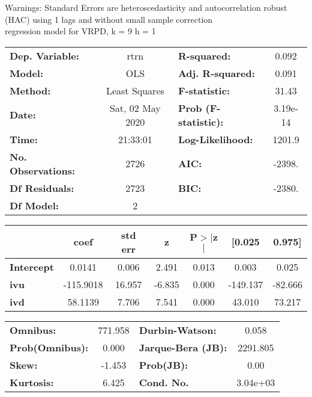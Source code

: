 Warnings: \newline
 [1] Standard Errors are heteroscedasticity and autocorrelation robust (HAC) using 1 lags and without small sample correction\\ 

regression model for VRPD, k = 9 h = 1\begin{center}
\begin{tabular}{lclc}
\toprule
\textbf{Dep. Variable:}    &       rtrn       & \textbf{  R-squared:         } &     0.092   \\
\textbf{Model:}            &       OLS        & \textbf{  Adj. R-squared:    } &     0.091   \\
\textbf{Method:}           &  Least Squares   & \textbf{  F-statistic:       } &     31.43   \\
\textbf{Date:}             & Sat, 02 May 2020 & \textbf{  Prob (F-statistic):} &  3.19e-14   \\
\textbf{Time:}             &     21:33:01     & \textbf{  Log-Likelihood:    } &    1201.9   \\
\textbf{No. Observations:} &        2726      & \textbf{  AIC:               } &    -2398.   \\
\textbf{Df Residuals:}     &        2723      & \textbf{  BIC:               } &    -2380.   \\
\textbf{Df Model:}         &           2      & \textbf{                     } &             \\
\bottomrule
\end{tabular}
\begin{tabular}{lcccccc}
                   & \textbf{coef} & \textbf{std err} & \textbf{z} & \textbf{P$> |$z$|$} & \textbf{[0.025} & \textbf{0.975]}  \\
\midrule
\textbf{Intercept} &       0.0141  &        0.006     &     2.491  &         0.013        &        0.003    &        0.025     \\
\textbf{ivu}       &    -115.9018  &       16.957     &    -6.835  &         0.000        &     -149.137    &      -82.666     \\
\textbf{ivd}       &      58.1139  &        7.706     &     7.541  &         0.000        &       43.010    &       73.217     \\
\bottomrule
\end{tabular}
\begin{tabular}{lclc}
\textbf{Omnibus:}       & 771.958 & \textbf{  Durbin-Watson:     } &    0.058  \\
\textbf{Prob(Omnibus):} &   0.000 & \textbf{  Jarque-Bera (JB):  } & 2291.805  \\
\textbf{Skew:}          &  -1.453 & \textbf{  Prob(JB):          } &     0.00  \\
\textbf{Kurtosis:}      &   6.425 & \textbf{  Cond. No.          } & 3.04e+03  \\
\bottomrule
\end{tabular}
\end{center}

